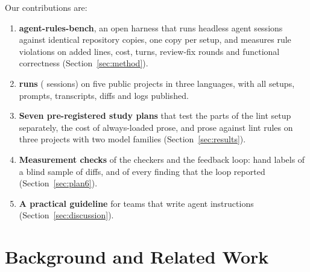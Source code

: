 \documentclass[pdflatex,sn-basic]{sn-jnl}
\begin{document}
Our contributions are:
\begin{enumerate}
\item \textbf{agent-rules-bench}, an open harness that runs headless agent sessions against identical repository copies, one copy per setup, and measures rule violations on added lines, cost, turns, review-fix rounds and functional correctness (Section~\ref{sec:method}).
\item \textbf{\NTotalRunsEMSE{} runs} (\NTotalSessionsEMSE{} sessions) on five public projects in three languages, with all setups, prompts, transcripts, diffs and logs published.
\item \textbf{Seven pre-registered study plans} that test the parts of the lint setup separately, the cost of always-loaded prose, and prose against lint rules on three projects with two model families (Section~\ref{sec:results}).
\item \textbf{Measurement checks} of the checkers and the feedback loop: hand labels of a blind sample of diffs, and of every finding that the loop reported (Section~\ref{sec:plan6}).
\item \textbf{A practical guideline} for teams that write agent instructions (Section~\ref{sec:discussion}).
\end{enumerate}

\section{Background and Related Work}
\label{sec:related}
\end{document}
